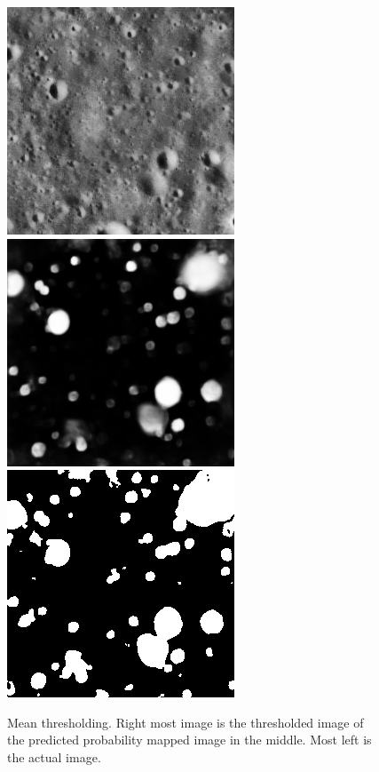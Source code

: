 \documentclass[11pt]{article}
\begin{document}
\begin{figure}[H]
	\includegraphics[width=.3\textwidth]{files/results/26.png}\hfill
	\includegraphics[width=.3\textwidth]{files/results/26_predict.png}\hfill
	\includegraphics[width=.3\textwidth]{files/results/mean.png}
	\caption{Mean thresholding. Right most image is the thresholded image of the predicted probability mapped image in the middle. Most left is the actual image.}
	\label{mean_th}
\end{figure}
\end{document}
